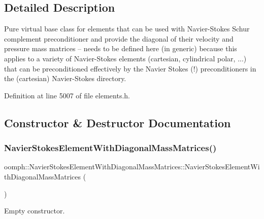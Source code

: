 \subsection{Detailed Description}
Pure virtual base class for elements that can be used with Navier-\/\+Stokes Schur complement preconditioner and provide the diagonal of their velocity and pressure mass matrices -- needs to be defined here (in generic) because this applies to a variety of Navier-\/\+Stokes elements (cartesian, cylindrical polar, ...) that can be preconditioned effectively by the Navier Stokes (!) preconditioners in the (cartesian) Navier-\/\+Stokes directory. 

Definition at line 5007 of file elements.\+h.



\subsection{Constructor \& Destructor Documentation}
\mbox{\label{classoomph_1_1NavierStokesElementWithDiagonalMassMatrices_ac7a1a5b65cbc7a5afce8abaf1c3df308}} 
\subsubsection{\texorpdfstring{Navier\+Stokes\+Element\+With\+Diagonal\+Mass\+Matrices()}{NavierStokesElementWithDiagonalMassMatrices()}\hspace{0.1cm}{\footnotesize\ttfamily [1/2]}}
{\footnotesize\ttfamily oomph\+::\+Navier\+Stokes\+Element\+With\+Diagonal\+Mass\+Matrices\+::\+Navier\+Stokes\+Element\+With\+Diagonal\+Mass\+Matrices (\begin{DoxyParamCaption}{ }\end{DoxyParamCaption})\hspace{0.3cm}{\ttfamily [inline]}}



Empty constructor. 



